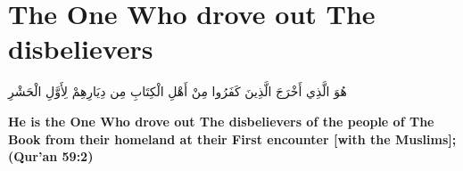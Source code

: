\chapter{The One Who drove out The disbelievers}
\begin{center}
    {\Huge    
        \begin{Arabic}
            هُوَ الَّذِي أَخْرَجَ الَّذِينَ كَفَرُوا مِنْ أَهْلِ الْكِتَابِ مِن دِيَارِهِمْ لِأَوَّلِ الْحَشْرِ
        \end{Arabic}
    }
\end{center}
\vspace*{\fill}
\vspace{3cm}
\begin{center}
    \large \textbf{He is the One Who drove out The disbelievers of the people of The Book from their homeland at their First encounter [with the Muslims]; (Qur'an 59:2)}
\end{center}
